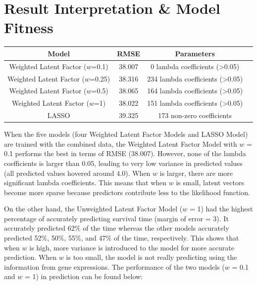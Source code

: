 \documentclass[a4paper]{article}
\begin{document}
\section{Result Interpretation \& Model Fitness}

\begin{center}
\begin{minipage}{\linewidth}
\centering
{} \label{tab:title}
\begin{tabular}{|c|c|c|c|}
\hline	
Model & RMSE & Parameters \\
\hline\hline
Weighted Latent Factor ($w$=0.1) & 38.007 & 0 lambda coefficients (>0.05) \\
\hline
Weighted Latent Factor ($w$=0.25) & 38.316 & 234 lambda coefficients (>0.05) \\
\hline
Weighted Latent Factor ($w$=0.5) & 38.065 & 164 lambda coefficients (>0.05) \\
\hline
Weighted Latent Factor ($w$=1) & 38.022 & 151 lambda coefficients (>0.05) \\
\hline

LASSO & 39.325 & 173 non-zero coefficients \\
\hline
\end{tabular}
\end{minipage}
\end{center}

When the five models (four Weighted Latent Factor Models and LASSO Model) are trained with the combined data, the Weighted Latent Factor Model with $w$ = 0.1 performs the best in terms of RMSE (38.007). However, none of the lambda coefficients is larger than 0.05, leading to very low variance in predicted values (all predicted values hovered around 4.0). When $w$ is larger, there are more significant lambda coefficients. This means that when $w$ is small, latent vectors become more sparse because predictors contribute less to the likelihood function.

On the other hand, the Unweighted Latent Factor Model ($w$ = 1) had the highest percentage of accurately predicting survival time (margin of error = 3). It accurately predicted 62$\%$ of the time whereas the other models accurately predicted 52$\%$, 50$\%$, 55$\%$, and 47$\%$ of the time, respectively. This shows that when $w$ is high, more variance is introduced to the model for more accurate prediction. When $w$ is too small, the model is not really predicting using the information from gene expressions. The performance of the two models ($w$ = 0.1 and $w$ = 1) in prediction can be found below:
\end{document}
